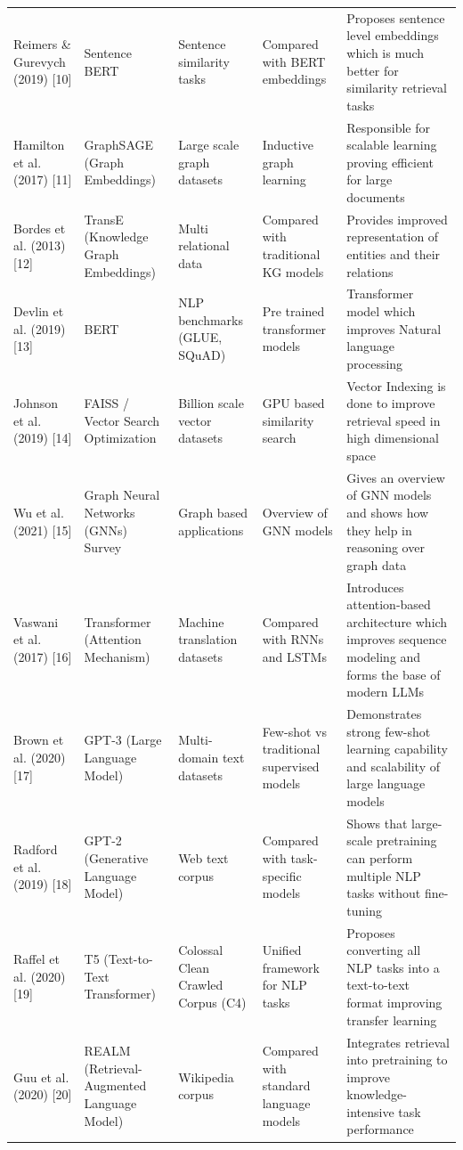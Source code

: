 \documentclass[10pt]{article}
\begin{document}
\begin{longtable}{P{2.1cm} P{2.1cm} P{2.2cm} P{2.9cm} P{5.0cm}}
Reimers \& Gurevych (2019) [10] & Sentence BERT & Sentence similarity tasks & Compared with BERT embeddings & Proposes sentence level embeddings which is much better for similarity retrieval tasks\\
Hamilton et al. (2017) [11] & GraphSAGE (Graph Embeddings) & Large scale graph datasets & Inductive graph learning & Responsible for scalable learning proving efficient for large documents\\
Bordes et al. (2013) [12] & TransE (Knowledge Graph Embeddings) & Multi relational data & Compared with traditional KG models & Provides improved representation of entities and their relations\\
Devlin et al. (2019) [13] & BERT & NLP benchmarks (GLUE, SQuAD) & Pre trained transformer models & Transformer model which improves Natural language processing\\
Johnson et al. (2019) [14] & FAISS / Vector Search Optimization & Billion scale vector datasets & GPU based similarity search & Vector Indexing is done to improve retrieval speed in high dimensional space\\
Wu et al. (2021) [15] & Graph Neural Networks (GNNs) Survey & Graph based applications & Overview of GNN models & Gives an overview of GNN models and shows how they help in reasoning over graph data\\
Vaswani et al. (2017) [16] & Transformer (Attention Mechanism) & Machine translation datasets & Compared with RNNs and LSTMs & Introduces attention-based architecture which improves sequence modeling and forms the base of modern LLMs\\
Brown et al. (2020) [17] & GPT-3 (Large Language Model) & Multi-domain text datasets & Few-shot vs traditional supervised models & Demonstrates strong few-shot learning capability and scalability of large language models\\
Radford et al. (2019) [18] & GPT-2 (Generative Language Model) & Web text corpus & Compared with task-specific models & Shows that large-scale pretraining can perform multiple NLP tasks without fine-tuning\\
Raffel et al. (2020) [19] & T5 (Text-to-Text Transformer) & Colossal Clean Crawled Corpus (C4) & Unified framework for NLP tasks & Proposes converting all NLP tasks into a text-to-text format improving transfer learning\\
Guu et al. (2020) [20] & REALM (Retrieval-Augmented Language Model) & Wikipedia corpus & Compared with standard language models & Integrates retrieval into pretraining to improve knowledge-intensive task performance\\
\bottomrule
\end{longtable}
\end{document}
